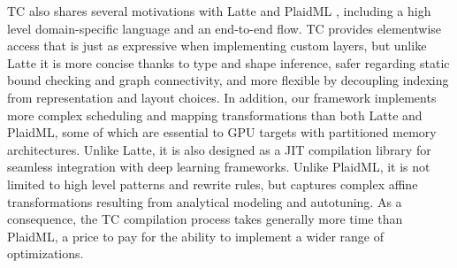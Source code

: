 



TC also shares several motivations with Latte \cite{Latte} and PlaidML
\cite{PlaidML}, including a high level domain-specific language and an
end-to-end flow.  TC provides elementwise access that is just as
expressive when implementing custom layers, but unlike Latte it is
more concise thanks to type and shape inference, safer regarding
static bound checking and graph connectivity, and more flexible by
decoupling indexing from representation and layout choices.
In addition, our framework implements more complex
scheduling and mapping transformations than both Latte and PlaidML,
some of which are essential to GPU targets with partitioned memory
architectures. Unlike Latte, it is also designed as a JIT compilation
library for seamless integration with deep learning frameworks. Unlike
PlaidML, it is not limited to high level patterns and rewrite rules,
but captures complex affine transformations resulting from analytical
modeling and autotuning. As a consequence, the TC compilation process
takes generally more time than PlaidML, a price to pay for the ability
to implement a wider range of optimizations.

